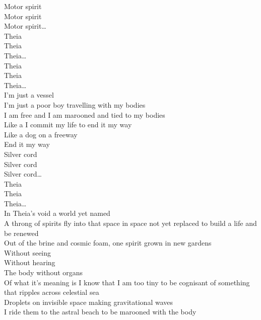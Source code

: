 
Motor spirit \\
Motor spirit \\
Motor spirit… \\

Theia \\
Theia \\
Theia… \\

Theia \\
Theia \\
Theia… \\

I'm just a vessel \\
I'm just a poor boy travelling with my bodies \\
I am free and I am marooned and tied to my bodies \\

Like a  I commit my life to end it my way \\
Like a dog on a freeway \\
End it my way \\

Silver cord \\
Silver cord \\
Silver cord… \\

Theia \\
Theia \\
Theia… \\

In Theia's void a world yet named \\
A throng of spirits fly into that space in space not yet replaced to build a life and be renewed \\
Out of the brine and cosmic foam, one spirit grown in new gardens \\
Without seeing \\
Without hearing \\
The body without organs \\

Of what it's meaning is I know that I am too tiny to be cognisant of something that ripples across celestial sea \\
Droplets on invisible space making gravitational waves \\
I ride them to the astral beach to be marooned with the body \\


